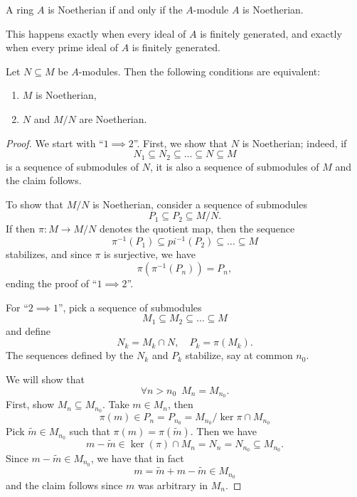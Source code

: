 \begin{df}
  A ring $A$ is Noetherian if and only if the $A$-module $A$ is Noetherian. 
\end{df}

\begin{prop}
  This happens exactly when every ideal of $A$ is finitely generated, and exactly when every prime ideal of $A$ is finitely generated.
\end{prop}

\begin{prop}
  \label{noetherian-extensions}
  Let $N \subseteq M$ be $A$-modules. Then the following conditions are equivalent:
  \begin{enumerate}
  \item $M$ is Noetherian,
  \item $N$ and $M/{N}$ are Noetherian.
  \end{enumerate}
\end{prop}
\begin{proof}
  We start with ``$1 \implies 2$''. First, we show that $N$ is Noetherian; indeed, if
  \[ N_1 \subseteq N_2 \subseteq \ldots \subseteq N \subseteq M\]
  is a sequence of submodules of $N$, it is also a sequence of submodules of $M$ and the claim follows.

  To show that $M /{N}$ is Noetherian, consider a sequence of submodules
  \[ P_1 \subseteq P_2 \subseteq M /{N}.\]
  If then $\pi \colon M \to M /{N}$ denotes the quotient map, then the sequence
  \[ \pi^{-1}(P_1) \subseteq pi^{-1}(P_2) \subseteq \ldots \subseteq M\]
  stabilizes, and since $\pi$ is surjective, we have
  \[ \pi(\pi^{-1}(P_n)) = P_n,\]
  ending the proof of ``$1 \implies 2$''.

  For ``$2 \implies 1$'', pick a sequence of submodules
  \[M_1 \subseteq M_2 \subseteq \ldots \subseteq M\]
  and define
  \[ N_k = M_k \cap N, \quad P_k = \pi(M_k).\]
  The sequences defined by the $N_k$ and $P_k$ stabilize, say at common $n_0$.

  We will show that
  \[ \forall n > n_0 \enspace M_n = M_{n_0}.\]
  First, show $M_n \subseteq M_{n_0}$. Take $m \in M_n$, then
  \[ \pi(m) \in P_n = P_{n_0} = M_{n_0} / {\ker \pi \cap M_{n_0}}\]
  Pick $\tilde m \in M_{n_0}$ such that $\pi(m) = \pi(\tilde m)$.
  Then we have
  \[ m - \tilde{m} \in \ker(\pi) \cap M_n = N_n = N_{n_0} \subseteq M_{n_0}.\]
  Since $m-\tilde{m} \in M_{n_0}$, we have that
  in fact
  \[ m = \tilde{m} + m - \tilde{m} \in M_{n_0}\]
  and the claim follows since $m$ was arbitrary in $M_n$.
\end{proof}


